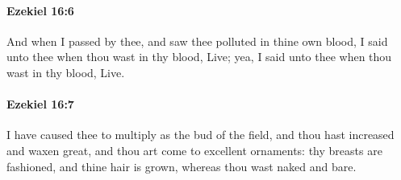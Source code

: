 		\paragraph{Ezekiel 16:6} %
			\label{EZEKIEL-16-6}

			And when I passed by thee, and saw thee polluted in thine own blood, I said unto thee when thou wast in thy blood, Live; yea, I said unto thee when thou wast in thy blood, Live.


		\paragraph{Ezekiel 16:7} %
			\label{EZEKIEL-16-7}

			I have caused thee to multiply as the bud of the field, and thou hast increased and waxen great, and thou art come to excellent ornaments: thy breasts are fashioned, and thine hair is grown, whereas thou wast naked and bare.

